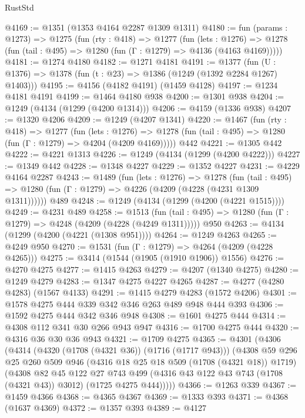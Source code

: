 \begin{lexlean}{RustStd}
\begin{coremodule}
{\begin{coremodule}
{{{{{{{{{{{@4169 := @1351 (@1353 @4164 @2287 @1309 @1311)
@4180 := fun (params : @1273) =>
  @1275
    (fun (rty : @418) =>
    @1277
      (fun (lets : @1276) =>
      @1278 (fun (tail : @495) => @1280 (fun (Γ : @1279) => @4136 (@4163 @4169)))))
@4181 := @1274 @4180
@4182 := @1271 @4181
@4191 := @1377 (fun (U : @1376) => @1378 (fun (t : @23) => @1386 (@1249 (@1392 @2284 @1267) @1403)))
@4195 := @4156 (@4182 @4191) (@1459 @4128)
@4197 := @1234 @4181 @4191
@4199 := @1464 @4180 @938
@4200 := @1301 @938
@4204 := @1249 (@4134 (@1299 (@4200 @1314)))
@4206 := @4159 (@1336 @938)
@4207 := @1320 @4206
@4209 := @1249 (@4207 @1341)
@4220 := @1467
    (fun (rty : @418) =>
    @1277
      (fun (lets : @1276) =>
      @1278 (fun (tail : @495) => @1280 (fun (Γ : @1279) => @4204 (@4209 @4169)))))
    @442
@4221 := @1305 @442
@4222 := @4221 @1313
@4226 := @1249 (@4134 (@1299 (@4200 @4222)))
@4227 := @1349 @442
@4228 := @1348 @4227
@4229 := @1352 @4227
@4231 := @4229 @4164 @2287
@4243 := @1489
    (fun (lets : @1276) =>
    @1278
      (fun (tail : @495) => @1280 (fun (Γ : @1279) => @4226 (@4209 (@4228 (@4231 @1309 @1311))))))
    @489
@4248 := @1249 (@4134 (@1299 (@4200 (@4221 @1515))))
@4249 := @4231 @489
@4258 := @1513
    (fun (tail : @495) => @1280 (fun (Γ : @1279) => @4248 (@4209 (@4228 (@4249 @1311)))))
    @950
@4263 := @4134 (@1299 (@4200 (@4221 (@1308 @951))))
@4264 := @1249 @4263
@4265 := @4249 @950
@4270 := @1531 (fun (Γ : @1279) => @4264 (@4209 (@4228 @4265)))
@4275 := @3414 (@1544 (@1905 (@1910 @1906)) @1556)
@4276 := @4270 @4275
@4277 := @1415 @4263
@4279 := @4207 (@1340 @4275)
@4280 := @1249 @4279
@4283 := @1347 @4275 @4227 @4265
@4287 := @4277 (@4280 @4283) (@1567 @4133)
@4291 := @1415 @4279 @4283 (@1572 @4206)
@4301 := @1578 @4275 @444 @339 @342 @346 @263 @489 @948 @444 @393
@4306 := @1592 @4275 @444 @342 @346 @948
@4308 := @1601 @4275 @444
@4314 := @4308 @112 @341 @30 @266 @943 @947
@4316 := @1700 @4275 @444
@4320 := @4316 @36 @30 @36 @943
@4321 := @1709 @4275
@4365 := @4301
    (@4306
      (@4314
        (@4320 (@1708 (@4321 @36)) (@1716 (@1717 @943)))
        (@4308
          @59
          @296
          @25
          @260
          @509
          @946
          (@4316 @18 @25 @18 @509 (@1708 (@4321 @18)) @1719)
          (@4308
            @82
            @45
            @122
            @27
            @743
            @499
            (@4316 @43 @122 @43 @743 (@1708 (@4321 @43)) @3012)
            (@1725 @4275 @444)))))
@4366 := @1263 @339
@4367 := @1459 @4366
@4368 := @4365 @4367
@4369 := @1333 @393
@4371 := @4368 (@1637 @4369)
@4372 := @1357 @393
@4389 := @4127
}}}}}}}}}}}
\end{coremodule}}
\end{coremodule}
\end{lexlean}
